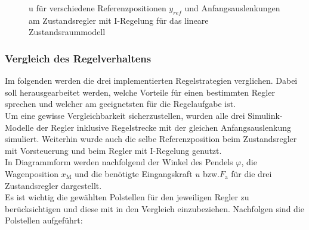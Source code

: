 \documentclass[
	pagesize,
	fontsize=12pt,
	paper=a4,
	oneside,
   reqno
]{scrartcl}
\newcommand{\bzw}{bzw.\xspace}
\begin{document}
\begin{figure}[H]
    \centering
    \caption[u für Regler mit I-Regelung (linear)]{u für verschiedene Referenzpositionen $y_{ref}$ und Anfangsauslenkungen am Zustandsregler mit I-Regelung für das lineare Zustandsraummodell}
    \label{fig:Bild20}
\end{figure}

\subsubsection{Vergleich des Regelverhaltens}

Im folgenden werden die drei implementierten Regelstrategien verglichen. Dabei soll herausgearbeitet werden, welche Vorteile für einen bestimmten Regler sprechen und welcher am geeignetsten für die Regelaufgabe ist. \\
Um eine gewisse Vergleichbarkeit sicherzustellen, wurden alle drei Simulink-Modelle der Regler inklusive Regelstrecke mit der gleichen Anfangsauslenkung simuliert. Weiterhin wurde auch die selbe Referenzposition beim Zustandsregler mit Vorsteuerung und beim Regler mit I-Regelung genutzt. \\
In Diagrammform werden nachfolgend der Winkel des Pendels $\varphi$, die Wagenposition $x_{\mathrm{M}}$ und die benötigte Eingangskraft $u$ \bzw $F_{\mathrm{a}}$ für die drei Zustandsregler dargestellt. \\
Es ist wichtig die gewählten Polstellen für den jeweiligen Regler zu berücksichtigen und diese mit in den Vergleich einzubeziehen. Nachfolgen sind die Polstellen aufgeführt:
\end{document}
